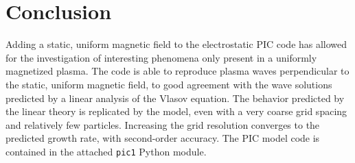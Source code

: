 \documentclass[%
 reprint,
 amsmath,amssymb,
 aps,
]{revtex4-2}
\begin{document}
\section{Conclusion}

Adding a static, uniform magnetic field to the electrostatic PIC code has allowed for the investigation of interesting phenomena only present in a uniformly magnetized plasma. The code is able to reproduce plasma waves perpendicular to the static, uniform magnetic field, to good agreement with the wave solutions predicted by a linear analysis of the Vlasov equation. The behavior predicted by the linear theory is replicated by the model, even with a very coarse grid spacing and relatively few particles. Increasing the grid resolution converges to the predicted growth rate, with second-order accuracy. The PIC model code is contained in the attached \texttt{pic1} Python module.

\nocite{*}

\end{document}
